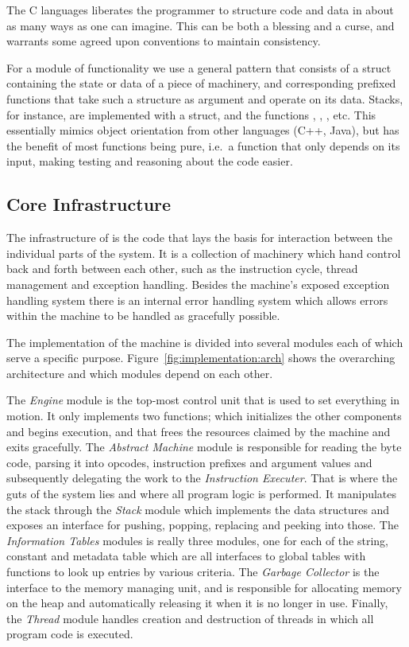 The C languages liberates the programmer to structure code and data in about as
many ways as one can imagine. This can be both a blessing and a curse, and
warrants some agreed upon conventions to maintain consistency.

For a module of functionality we use a general pattern that consists of a struct
containing the state or data of a piece of machinery, and corresponding prefixed
functions that take such a structure as argument and operate on its
data. Stacks, for instance, are implemented with a  struct, and the
functions , , , etc. This
essentially mimics object orientation from other languages (C++, Java), but has
the benefit of most functions being pure, i.e.~a function that only depends on
its input, making testing and reasoning about the code easier.

\subsection{Core Infrastructure}
\label{sec:implementation:core}

The infrastructure of \thename{} is the code that lays the basis for interaction
between the individual parts of the system. It is a collection of machinery
which hand control back and forth between each other, such as the instruction
cycle, thread management and exception handling. Besides the machine's exposed
exception handling system there is an internal error handling system which
allows errors within the machine to be handled as gracefully possible.

The implementation of the machine is divided into several modules each of which
serve a specific purpose. Figure~\ref{fig:implementation:arch} shows the
overarching architecture and which modules depend on each other.

The \textit{Engine} module is the top-most control unit that is used to set
everything in motion. It only implements two functions;  which
initializes the other components and begins execution, and  that
frees the resources claimed by the machine and exits gracefully. The
\textit{Abstract Machine} module is responsible for reading the byte code,
parsing it into opcodes, instruction prefixes and argument values and
subsequently delegating the work to the \textit{Instruction Executer}. That is
where the guts of the system lies and where all program logic is performed. It
manipulates the stack through the \textit{Stack} module which implements the
data structures and exposes an interface for pushing, popping, replacing and
peeking into those. The \textit{Information Tables} modules is really three
modules, one for each of the string, constant and metadata table which are all
interfaces to global tables with functions to look up entries by various
criteria. The \textit{Garbage Collector} is the interface to the memory managing
unit, and is responsible for allocating memory on the heap and automatically
releasing it when it is no longer in use. Finally, the \textit{Thread} module
handles creation and destruction of threads in which all program code is
executed.

